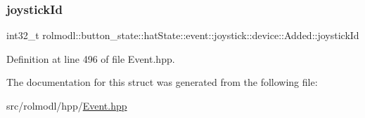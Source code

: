 \subsubsection{\texorpdfstring{joystickId}{joystickId}}
{\footnotesize\ttfamily int32\+\_\+t rolmodl\+::button\+\_\+state\+::hat\+State\+::event\+::joystick\+::device\+::\+Added\+::joystick\+Id}



Definition at line 496 of file Event.\+hpp.



The documentation for this struct was generated from the following file\+:\begin{DoxyCompactItemize}
\item 
src/rolmodl/hpp/\mbox{\hyperlink{_event_8hpp}{Event.\+hpp}}\end{DoxyCompactItemize}

